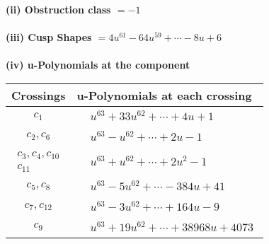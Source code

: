 \documentclass[1p]{elsarticle_modified}
\theoremstyle{definition}
\begin{document}
\flushleft \textbf{(ii) Obstruction class $= -1$}\\~\\
\flushleft \textbf{(iii) Cusp Shapes $= 4 u^{61}-64 u^{59}+\cdots-8 u+6$}\\~\\
\newpage\renewcommand{\arraystretch}{1}
\flushleft \textbf{(iv) u-Polynomials at the component}\newline \\
\begin{tabular}{m{50pt}|m{274pt}}
Crossings & \hspace{64pt}u-Polynomials at each crossing \\
\hline $$\begin{aligned}c_{1}\end{aligned}$$&$\begin{aligned}
&u^{63}+33 u^{62}+\cdots+4 u+1
\end{aligned}$\\
\hline $$\begin{aligned}c_{2},c_{6}\end{aligned}$$&$\begin{aligned}
&u^{63}- u^{62}+\cdots+2 u-1
\end{aligned}$\\
\hline $$\begin{aligned}c_{3},c_{4},c_{10}\\c_{11}\end{aligned}$$&$\begin{aligned}
&u^{63}+u^{62}+\cdots+2 u^2-1
\end{aligned}$\\
\hline $$\begin{aligned}c_{5},c_{8}\end{aligned}$$&$\begin{aligned}
&u^{63}-5 u^{62}+\cdots-384 u+41
\end{aligned}$\\
\hline $$\begin{aligned}c_{7},c_{12}\end{aligned}$$&$\begin{aligned}
&u^{63}-3 u^{62}+\cdots+164 u-9
\end{aligned}$\\
\hline $$\begin{aligned}c_{9}\end{aligned}$$&$\begin{aligned}
&u^{63}+19 u^{62}+\cdots+38968 u+4073
\end{aligned}$\\
\hline
\end{tabular}\\~\\
\end{document}
